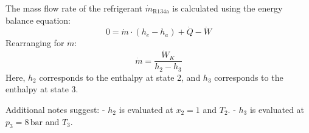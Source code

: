 The mass flow rate of the refrigerant \( \dot{m}_{\text{R134a}} \) is calculated using the energy balance equation:  
\[
0 = \dot{m} \cdot (h_e - h_a) + \dot{Q} - \dot{W}
\]  
Rearranging for \( \dot{m} \):  
\[
\dot{m} = \frac{\dot{W}_K}{h_2 - h_3}
\]  
Here, \( h_2 \) corresponds to the enthalpy at state 2, and \( h_3 \) corresponds to the enthalpy at state 3.  

Additional notes suggest:  
- \( h_2 \) is evaluated at \( x_2 = 1 \) and \( T_2 \).  
- \( h_3 \) is evaluated at \( p_3 = 8 \, \text{bar} \) and \( T_3 \).